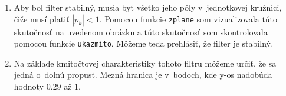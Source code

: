 \documentclass[10pt, a4paper, twocolumn]{article}
\begin{document}
\begin{enumerate}[leftmargin=*]
\item Aby bol filter stabilný, musia byť všetko jeho póly v~jednotkovej kružnici, čiže musí platiť  $|p_k| < 1$. Pomocou funkcie \texttt{zplane} som vizualizovala túto skutočnosť na uvedenom obrázku a túto skutočnosť som skontrolovala pomocou funkcie \texttt{ukazmito}. Môžeme teda prehlásiť, že filter je stabilný.
\begin{figure}[H]
\centering
{}
\end{figure}

\item Na základe kmitočtovej charakteristiky tohoto filtru môžeme určiť, že sa jedná o~dolnú propusť. Mezná hranica je v~bodoch, kde y-os nadobúda hodnoty $0.29$ až $1$. 
\begin{figure}[H]
\centering
{}
\end{figure}


\end{enumerate}
\end{document}
